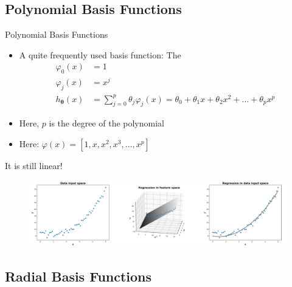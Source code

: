 \subsection{Polynomial Basis Functions}

\begin{frame}{Polynomial Basis Functions}{}
	\begin{itemize}
		\item A quite frequently used basis function: The 
		\begin{align*}
			\varphi_0(x) 			&= 1 	\\
			\varphi_j(x) 			&= x^j	\\
			h_{\bm{\theta}}(x) 	&= \sum_{j=0}^p \theta_j \varphi_j(x) = \theta_0 + \theta_1 x +
									\theta_2 x^2 + \dots + \theta_p x^p
		\end{align*}
		\item Here, $p$ is the degree of the polynomial
		\item Here: $\varphi(x) = [1, x, x^2, x^3, \dots, x^p]$
	\end{itemize}
\end{frame}


\begin{frame}{It is still linear!}{}
	\begin{figure}
		\includegraphics[scale=0.3]{05_regression/02_img/basis_function_regression_visualization}
	\end{figure}
\end{frame}


\subsection{Radial Basis Functions}

